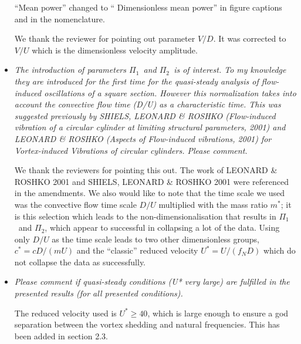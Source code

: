 \documentclass[]{article}
\newcommand{\ustar}{\ensuremath{U^{*}}}
\newcommand{\massstiff}{\ensuremath{\Pi_1}}
\newcommand{\massdamp}{\ensuremath{\Pi_2}}
\begin{document}
\begin{itemize}
“Mean power” changed to “ Dimensionless mean power” in figure captions and in the nomenclature. 

We thank the reviewer for pointing out parameter $V/D$. It was corrected to $V/U$ which is the dimensionless velocity amplitude.


\item \emph{The introduction of parameters \massstiff \ and \massdamp \ is of interest. To my knowledge they are introduced for the first time for the quasi-steady analysis of flow-induced oscillations of a square section. However this normalization takes into account the convective flow time (D/U) as a characteristic time. This was suggested previously by SHIELS, LEONARD \& ROSHKO (Flow-induced vibration of a circular cylinder at limiting
	structural parameters, 2001) and  LEONARD \& ROSHKO (Aspects of Flow-induced vibrations, 2001) for Vortex-induced Vibrations of circular cylinders. Please comment.}

We thank the reviewers for pointing this out. The work of LEONARD \& ROSHKO 2001 and SHIELS, LEONARD \& ROSHKO 2001 were referenced in the amendments. We also would like to note that the time scale we used  was the convective flow time scale $D/U$ multiplied with the mass ratio $m^*$; it is this selection which leads to the non-dimensionalisation that results in \massstiff\ and \massdamp, which appear to successful in collapsing a lot of the data. Using only $D/U$ as the time scale leads to two other dimensionless groups, $c^* = cD/(mU)$ and the ``classic'' reduced velocity $U^* = U/(f_ND)$ which do not collapse the data as successfully.

\item \emph{ Please comment if quasi-steady conditions (U* very large) are fulfilled in the presented results (for all presented conditions).}

The reduced velocity used is $\ustar \geq 40$, which is large enough to ensure a god separation between the vortex shedding and natural frequencies. This has been added in section 2.3. 

\end{itemize}
\end{document}
